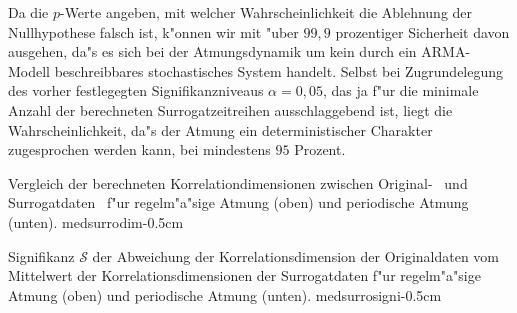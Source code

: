 Da die $p$-Werte angeben, mit welcher Wahrscheinlichkeit die Ablehnung der Nullhypothese
falsch ist, k"onnen wir mit "uber $99,9$ prozentiger Sicherheit davon ausgehen, da"s es
sich bei der Atmungsdynamik um kein durch ein ARMA-Modell beschreibbares stochastisches
System handelt. Selbst bei Zugrundelegung des vorher festlegegten Signifikanzniveaus
$\alpha=0,05$, das ja f"ur die minimale Anzahl der berechneten Surrogatzeitreihen
ausschlaggebend ist, liegt die Wahrscheinlichkeit, da"s der Atmung ein deterministischer
Charakter zugesprochen werden kann, bei mindestens $95$ Prozent.

{
Vergleich der berechneten Korrelationdimensionen zwischen Original- \gpmarkb\  und
Surrogatdaten \gpmarka\  f"ur regelm"a"sige Atmung (oben) und periodische Atmung (unten). 
}
{medsurrodim}{-0.5cm}

{
Signifikanz $\mathcal{S}$ der Abweichung der Korrelationsdimension der Originaldaten vom
Mittelwert der Korrelationsdimensionen der Surrogatdaten f"ur regelm"a"sige Atmung (oben)
und periodische Atmung (unten).
}
{medsurrosigni}{-0.5cm}


